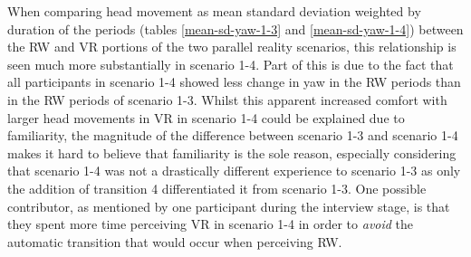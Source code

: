When comparing head movement as mean standard deviation weighted by duration of the periods (tables \ref{mean-sd-yaw-1-3} and \ref{mean-sd-yaw-1-4}) between the RW and VR portions of the two parallel reality scenarios, this relationship is seen much more substantially in scenario 1-4. Part of this is due to the fact that all participants in scenario 1-4 showed less change in yaw in the RW periods than in the RW periods of scenario 1-3. Whilst this apparent increased comfort with larger head movements in VR in scenario 1-4 could be explained due to familiarity, the magnitude of the difference between scenario 1-3 and scenario 1-4 makes it hard to believe that familiarity is the sole reason, especially considering that scenario 1-4 was not a drastically different experience to scenario 1-3 as only the addition of transition 4 differentiated it from scenario 1-3. One possible contributor, as mentioned by one participant during the interview stage, is that they spent more time perceiving VR in scenario 1-4 in order to \textit{avoid} the automatic transition that would occur when perceiving RW.

\vspace{1cm}

